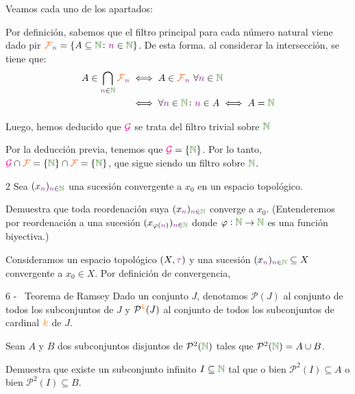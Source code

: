 \documentclass[titlepage,11pt,a4paper]{book}
\newcommand{\NN}{\ensuremath{\textcolor{OliveGreen}{\mathbb{N}}}}
\newcommand{\filt}{\ensuremath{\textcolor{Orange}{\mathcal{F}}}}
\newcommand{\gilt}{\ensuremath{\textcolor{Magenta}{\mathcal{G}}}}
\newcommand{\nn}{\ensuremath{\textcolor{Plum}{n}}}
\newcommand{\taut}{\textcolor{Fuchsia}{\tau}}
\newcommand{\kk}{\textcolor{orange}{k}}
\newcommand{\borde}[1]{%
  \begingroup
  \setlength{\fboxsep}{2.5pt}%
  \setlength{\fboxrule}{1pt}%
  \textcolor{black}{\fbox{\normalcolor\ensuremath{#1}}}%
  \hspace{4pt}%
  \vspace{0.5 pt}
  \endgroup
}
\begin{document}
    \begin{resol}
        Veamos cada uno de los apartados:

        \medskip
        \borde{(a)} Por definición, sabemos que el filtro principal para cada número natural viene dado pir $\filt_{\nn} = \{A \subseteq \NN \colon \nn \in \NN\}$. De esta forma. al considerar la intersección, se tiene que:
        \[
        \begin{aligned}
            A \in \bigcap_{\nn \in \NN} \filt_{\nn} &\iff A \in \filt_{\nn} \ \forall \nn \in \NN\\
            &\iff \forall \nn \in \NN \colon \nn \in A \iff A = \NN
        \end{aligned}
        \]

        Luego, hemos deducido que $\gilt$ se trata del filtro trivial sobre $\NN$

        \medskip
        \borde{(b)} Por la deducción previa, tenemos que $\gilt = \{\NN\}$. Por lo tanto, $\gilt \cap \filt = \{\NN\} \cap \filt = \{\NN\}$, que sigue siendo un filtro sobre $\NN$.
    \end{resol}

    \begin{ejer*}{2}
        Sea $(x_{\nn})_{\nn \in \NN}$ una sucesión convergente a $x_0$ en un espacio topológico.

        \smallskip
        Demuestra que toda reordenación suya $(x_{\nn})_{\nn \in \NN}$ converge a $x_0$. (Entenderemos por reordenación a una sucesión $(x_{\varphi(\nn)})_{\nn \in \NN}$ donde $\varphi : \NN \to \NN$ es una función biyectiva.)

    \end{ejer*}

     \begin{resol}
    Consideramos un espacio topológico $(X, \taut)$ y una sucesión $(x_{\nn})_{\nn \in \NN} \subseteq X$ convergente a $x_0 \in X$. Por definición de convergencia, 
     \end{resol}


    \begin{ejer*}{6 - \ Teorema de Ramsey}
        Dado un conjunto $J$, denotamos $\mathcal{P}(J)$ al conjunto de todos los subconjuntos de $J$ y $\mathcal{P}^{\kk}(J)$ al conjunto de todos los subconjuntos de cardinal $\kk$ de $J$.

        \medskip
        Sean $A$ y $B$ dos subconjuntos disjuntos de $\mathcal{P}^{2}(\NN)$ tales que $\mathcal{P}^{2}(\NN) = A \cup B$.
        
        \smallskip
        Demuestra que existe un subconjunto infinito $I \subseteq \NN$ tal que o bien $\mathcal{P}^{2}(I) \subseteq A$ o bien $\mathcal{P}^{2}(I) \subseteq B$.
    \end{ejer*}
\end{document}
